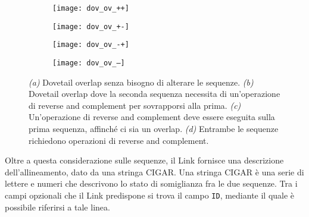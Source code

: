 \captionsetup{justification=centering}
\begin{figure}[h]
	\begin{subfigure}{.5\linewidth}
	  \centering
	  \texttt{[image: dov\_ov\_++]}
	  \caption{}
	  \label{fig:dov-ov++}
	\end{subfigure}%
	\begin{subfigure}{.5\linewidth}
	  \centering
	  \texttt{[image: dov\_ov\_+-]}
	  \caption{}
	  \label{fig:dov-ov+-}
	\end{subfigure}%
	
	\bigskip%
	
	\begin{subfigure}{0.5\linewidth}
	  \centering
	  \texttt{[image: dov\_ov\_-+]}
	  \caption{}
	  \label{fig:dov-ov-+}
	\end{subfigure}%
	\begin{subfigure}{0.5\linewidth}
	  \centering
	  \texttt{[image: dov\_ov\_--]}
	  \caption{}
	  \label{fig:dov-ov--}
	\end{subfigure}
	
	\captionsetup{justification=justified}
	\caption[Rappresentazione delle possibili situazioni di dovetail overlap]{
		\textit{(a)} Dovetail overlap senza bisogno di alterare le sequenze.
		\textit{(b)}  Dovetail overlap dove la seconda sequenza necessita
	  		di un'operazione di reverse and complement per sovrapporsi alla prima.
	  	\textit{(c)} Un'operazione di reverse and complement deve essere eseguita
	  		sulla prima sequenza, affinché ci sia un overlap.
	  	\textit{(d)} Entrambe le sequenze richiedono operazioni di reverse and complement.}
	\label{fig:dov-ov}
\end{figure}
\captionsetup{justification=justified}

Oltre a questa considerazione sulle sequenze, il Link fornisce una descrizione
dell'allineamento, dato da una stringa CIGAR. Una stringa CIGAR è
una serie di lettere e numeri che descrivono lo stato di somiglianza
fra le due sequenze.
Tra i campi opzionali che il Link predispone si trova il campo
\texttt{ID}, mediante il quale è possibile riferirsi a tale
linea.
\clearpage

